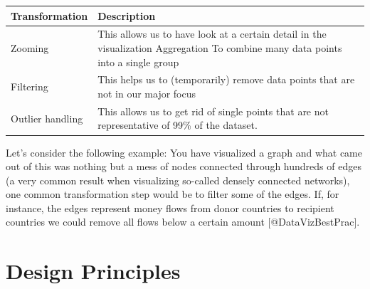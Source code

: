 \documentclass[]{book}
\theoremstyle{definition}
\theoremstyle{definition}
\theoremstyle{definition}
\theoremstyle{remark}
\begin{document}
\begin{longtable}[]{@{}ll@{}}
\toprule
\begin{minipage}[b]{0.16\columnwidth}\raggedright\strut
\textbf{Transformation}\strut
\end{minipage} & \begin{minipage}[b]{0.78\columnwidth}\raggedright\strut
\textbf{Description}\strut
\end{minipage}\tabularnewline
\midrule
\endhead
\begin{minipage}[t]{0.16\columnwidth}\raggedright\strut
Zooming\strut
\end{minipage} & \begin{minipage}[t]{0.78\columnwidth}\raggedright\strut
This allows us to have look at a certain detail in the visualization
Aggregation To combine many data points into a single group\strut
\end{minipage}\tabularnewline
\begin{minipage}[t]{0.16\columnwidth}\raggedright\strut
Filtering\strut
\end{minipage} & \begin{minipage}[t]{0.78\columnwidth}\raggedright\strut
This helps us to (temporarily) remove data points that are not in our
major focus\strut
\end{minipage}\tabularnewline
\begin{minipage}[t]{0.16\columnwidth}\raggedright\strut
Outlier handling\strut
\end{minipage} & \begin{minipage}[t]{0.78\columnwidth}\raggedright\strut
This allows us to get rid of single points that are not representative
of 99\% of the dataset.\strut
\end{minipage}\tabularnewline
\bottomrule
\end{longtable}

Let's consider the following example: You have visualized a graph and
what came out of this was nothing but a mess of nodes connected through
hundreds of edges (a very common result when visualizing so-called
densely connected networks), one common transformation step would be to
filter some of the edges. If, for instance, the edges represent money
flows from donor countries to recipient countries we could remove all
flows below a certain amount {[}@DataVizBestPrac{]}.

\section{Design Principles}\label{design-principles}
\end{document}
